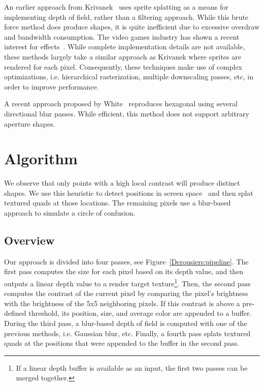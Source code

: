 An earlier approach from Krivanek~\cite{Krivanek03} uses sprite splatting as a means for implementing depth of field, rather than a filtering approach. While this brute force method does produce \bokeh shapes, it is quite inefficient due to excessive overdraw and bandwidth consumption. The video games industry has shown a recent interest for \bokeh effects~\cite{Sousa11,Futurmark11,Mittring11}. While complete implementation details are not available, these methods largely take a similar approach as Krivanek where sprites are rendered for each pixel. Consequently, these techniques make use of complex optimizations, i.e. hierarchical rasterization, multiple downscaling passes, etc, in order to improve performance. 

A recent approach proposed by White~\cite{White11} reproduces hexagonal \bokeh using several directional blur passes. While efficient, this method does not support arbitrary aperture shapes.

\section{Algorithm}
We observe that only points with a high local contrast will produce distinct \bokeh shapes. We use this heuristic to detect \bokeh positions in screen space~\cite{Pettineo11} and then splat textured quads at those locations. The remaining pixels use a blur-based approach to simulate a circle of confusion.

\subsection{Overview}
Our approach is divided into four passes, see Figure~\ref{Derousiers:pipeline}. The first pass computes the \coc size for each pixel based on its depth value, and then outputs a linear depth value to a render target texture\footnote{If a linear depth buffer is available as an input, the first two passes can be merged together.}. Then, the second pass computes the contrast of the current pixel by comparing the pixel's brightness with the brightness of the 5x5 neighboring pixels. If this contrast is above a pre-defined threshold, its position, \coc size, and average color are appended to a buffer. During the third pass, a blur-based depth of field is computed with one of the previous methods, i.e. Gaussian blur, etc. Finally, a fourth pass splats textured quads at the \bokeh positions that were appended to the buffer in the second pass.

